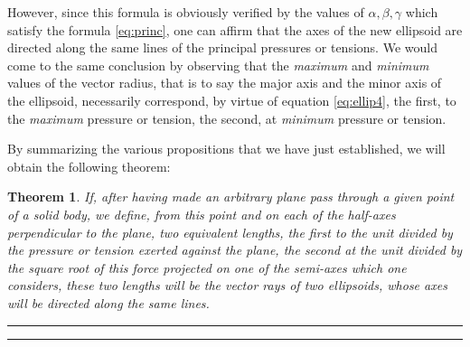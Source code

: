 \documentclass[leqno,openright,smallroyalvopaper,8pt,twoside,showtrims]{memoir}
\newtheorem{thm}{Theorem}
\begin{document}
\noindent However, since this formula is obviously verified by the values of $\alpha,\beta,\gamma$ which satisfy the formula \eqref{eq:princ}, one can affirm that the axes of the new ellipsoid are directed along the same lines of the principal pressures or tensions. We would come to the same conclusion by observing that the \emph{maximum} and \emph{minimum} values of the vector radius, that is to say the major axis and the minor axis of the ellipsoid, necessarily correspond, by virtue of equation \eqref{eq:ellip4}, the first, to the \emph{maximum} pressure or tension, the second, at \emph{minimum} pressure or tension.

By summarizing the various propositions that we have just established, we will obtain the following theorem:
\begin{thm}
If, after having made an arbitrary plane pass through a given point of a solid body, we define, from this point and on each of the half-axes perpendicular to the plane, two equivalent lengths, the first to the unit divided by the pressure or tension exerted against the plane, the second at the unit divided by the square root of this force projected on one of the semi-axes which one considers, these two lengths will be the vector rays of two ellipsoids, whose axes will be directed along the same lines.
\end{thm} 


\vspace*{.5cm}
\noindent
\rule{\textwidth}{0.5pt}\vspace*{-\baselineskip}\vspace*{2pt} 
\rule{\textwidth}{0.5pt} 
\end{document}
